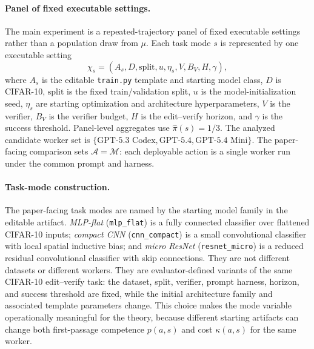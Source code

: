 \documentclass{article}
\newcommand{\cA}{\mathcal{A}}
\newcommand{\cM}{\mathcal{M}}
\begin{document}
\paragraph{Panel of fixed executable settings.}
The main experiment is a repeated-trajectory panel of fixed executable settings rather than a population draw from \(\mu\).
Each task mode \(s\) is represented by one executable setting
\[
\chi_s=(A_s,D,\mathrm{split},u,\eta_s,V,B_V,H,\gamma),
\]
where \(A_s\) is the editable \texttt{train.py} template and starting model class, \(D\) is CIFAR-10, \(\mathrm{split}\) is the fixed train/validation split, \(u\) is the model-initialization seed, \(\eta_s\) are starting optimization and architecture hyperparameters, \(V\) is the verifier, \(B_V\) is the verifier budget, \(H\) is the edit--verify horizon, and \(\gamma\) is the success threshold.
Panel-level aggregates use \(\hat\pi(s)=1/3\).
The analyzed candidate worker set is \(\{\text{GPT-5.3 Codex},\text{GPT-5.4},\text{GPT-5.4 Mini}\}\).
The paper-facing comparison sets \(\cA=\cM\): each deployable action is a single worker run under the common prompt and harness.

\paragraph{Task-mode construction.}
The paper-facing task modes are named by the starting model family in the editable artifact.
\textit{MLP-flat} (\texttt{mlp\_flat}) is a fully connected classifier over flattened CIFAR-10 inputs; \textit{compact CNN} (\texttt{cnn\_compact}) is a small convolutional classifier with local spatial inductive bias; and \textit{micro ResNet} (\texttt{resnet\_micro}) is a reduced residual convolutional classifier with skip connections.
They are not different datasets or different workers.
They are evaluator-defined variants of the same CIFAR-10 edit--verify task: the dataset, split, verifier, prompt harness, horizon, and success threshold are fixed, while the initial architecture family and associated template parameters change.
This choice makes the mode variable operationally meaningful for the theory, because different starting artifacts can change both first-passage competence \(p(a,s)\) and cost \(\kappa(a,s)\) for the same worker.
\end{document}
